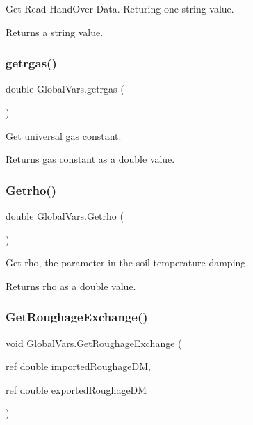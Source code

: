 Get Read Hand\+Over Data. Returing one string value. 

\begin{DoxyReturn}{Returns}
a string value. 
\end{DoxyReturn}
\mbox{\label{class_global_vars_ae9a1a598a830740085352e88a412d302}} 
\subsubsection{\texorpdfstring{getrgas()}{getrgas()}}
{\footnotesize\ttfamily double Global\+Vars.\+getrgas (\begin{DoxyParamCaption}{ }\end{DoxyParamCaption})\hspace{0.3cm}{\ttfamily [inline]}}



Get universal gas constant. 

\begin{DoxyReturn}{Returns}
gas constant as a double value. 
\end{DoxyReturn}
\mbox{\label{class_global_vars_a4b40cfa99d20bf081c2fb84351a31185}} 
\subsubsection{\texorpdfstring{Getrho()}{Getrho()}}
{\footnotesize\ttfamily double Global\+Vars.\+Getrho (\begin{DoxyParamCaption}{ }\end{DoxyParamCaption})\hspace{0.3cm}{\ttfamily [inline]}}



Get rho, the parameter in the soil temperature damping. 

\begin{DoxyReturn}{Returns}
rho as a double value. 
\end{DoxyReturn}
\mbox{\label{class_global_vars_a9ae8f3fa07b378ec836fa8519659f07e}} 
\subsubsection{\texorpdfstring{GetRoughageExchange()}{GetRoughageExchange()}}
{\footnotesize\ttfamily void Global\+Vars.\+Get\+Roughage\+Exchange (\begin{DoxyParamCaption}\item[{ref double}]{imported\+Roughage\+DM,  }\item[{ref double}]{exported\+Roughage\+DM }\end{DoxyParamCaption})\hspace{0.3cm}{\ttfamily [inline]}}



